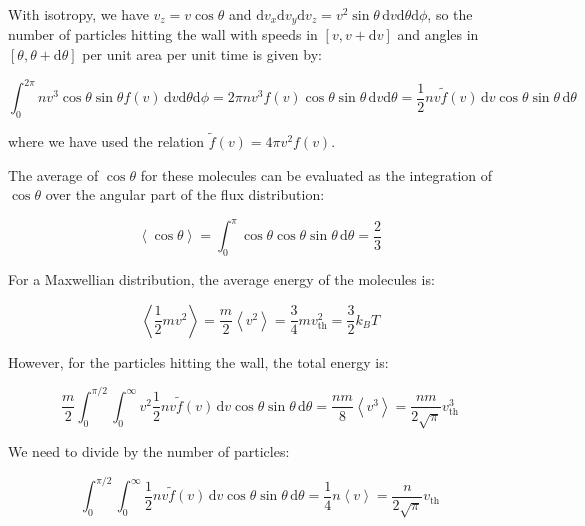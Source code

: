\documentclass[12pt]{article}
\begin{document}
With isotropy, we have $v_{z} = v\cos{\theta}$ and $\mathrm{d}v_{x} \mathrm{d}v_{y} \mathrm{d}v_{z} = v^{2} \sin{\theta} \, \mathrm{d}v \mathrm{d}\theta \mathrm{d}\phi$, so the number of particles hitting the wall with speeds in $[v, v + \mathrm{d}v]$ and angles in $[\theta, \theta + \mathrm{d}\theta]$ per unit area per unit time is given by:

\begin{equation}
    \int_{0}^{2\pi} nv^{3} \cos{\theta} \sin{\theta} f(v) \, \mathrm{d}v \mathrm{d}\theta \mathrm{d}\phi = 2\pi nv^{3} f(v) \cos{\theta} \sin{\theta} \, \mathrm{d}v \mathrm{d}\theta = \frac{1}{2} nv \tilde{f}(v) \, \mathrm{d}v \cos{\theta} \sin{\theta} \, \mathrm{d}\theta
\end{equation}

where we have used the relation $\tilde{f}(v) = 4\pi v^{2} f(v)$.

The average of $\cos{\theta}$ for these molecules can be evaluated as the integration of $\cos{\theta}$ over the angular part of the flux distribution:

\begin{equation}
    \left\langle \cos{\theta} \right\rangle = \int_{0}^{\pi} \cos{\theta} \cos{\theta} \sin{\theta} \, \mathrm{d}\theta = \frac{2}{3}
\end{equation}

For a Maxwellian distribution, the average energy of the molecules is:

\begin{equation}
    \left\langle \frac{1}{2} m v^{2} \right\rangle = \frac{m}{2} \left\langle v^{2} \right\rangle = \frac{3}{4} m v_{\text{th}}^{2} = \frac{3}{2} k_{B} T
\end{equation}

However, for the particles hitting the wall, the total energy is:

\begin{equation}
    \frac{m}{2} \int_{0}^{\pi/2} \int_{0}^{\infty} v^{2} \frac{1}{2} nv \tilde{f}(v) \, \mathrm{d}v \cos{\theta} \sin{\theta} \, \mathrm{d}\theta = \frac{nm}{8} \left\langle v^{3} \right\rangle = \frac{nm}{2\sqrt{\pi}} v_{\text{th}}^{3}
\end{equation}

We need to divide by the number of particles:

\begin{equation}
    \int_{0}^{\pi/2} \int_{0}^{\infty} \frac{1}{2} nv \tilde{f}(v) \, \mathrm{d}v \cos{\theta} \sin{\theta} \, \mathrm{d}\theta = \frac{1}{4} n \left\langle v \right\rangle = \frac{n}{2\sqrt{\pi}} v_{\text{th}}
\end{equation}
\end{document}
